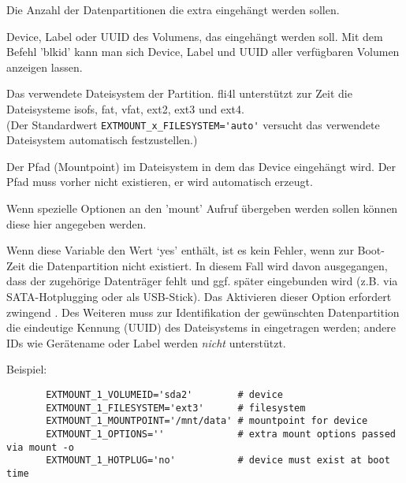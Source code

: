 \begin{description}

    Die Anzahl der Datenpartitionen die extra eingehängt werden sollen.


    Device, Label oder UUID des Volumens, das eingehängt werden soll.
    Mit dem Befehl 'blkid' kann man sich Device, Label und UUID aller
    verfügbaren Volumen anzeigen lassen.


    Das verwendete Dateisystem der Partition. fli4l unterstützt zur Zeit 
    die Dateisysteme isofs, fat, vfat, ext2, ext3 und ext4.\\
    (Der Standardwert \verb*?EXTMOUNT_x_FILESYSTEM='auto'? versucht das
    verwendete Dateisystem automatisch festzustellen.)


    Der Pfad (Mountpoint) im Dateisystem in dem das Device eingehängt wird. Der Pfad
    muss vorher nicht existieren, er wird automatisch erzeugt.


    Wenn spezielle Optionen an den 'mount' Aufruf übergeben werden sollen
    können diese hier angegeben werden.


    Wenn diese Variable den Wert `yes' enthält, ist es kein Fehler, wenn zur
    Boot-Zeit die Datenpartition nicht existiert. In diesem Fall wird davon
    ausgegangen, dass der zugehörige Datenträger fehlt und ggf. später
    eingebunden wird (z.B. via SATA-Hotplugging oder als USB-Stick). Das
    Aktivieren dieser Option erfordert zwingend . Des
    Weiteren muss zur Identifikation der gewünschten Datenpartition die
    eindeutige Kennung (UUID) des Dateisystems in 
    eingetragen werden; andere IDs wie Gerätename oder Label werden \emph{nicht}
    unterstützt.

\end{description}

Beispiel:
\begin{example}
\begin{verbatim}
       EXTMOUNT_1_VOLUMEID='sda2'        # device
       EXTMOUNT_1_FILESYSTEM='ext3'      # filesystem
       EXTMOUNT_1_MOUNTPOINT='/mnt/data' # mountpoint for device
       EXTMOUNT_1_OPTIONS=''             # extra mount options passed via mount -o
       EXTMOUNT_1_HOTPLUG='no'           # device must exist at boot time
\end{verbatim}
\end{example}



